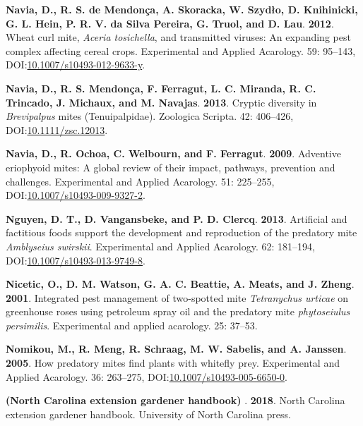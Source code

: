 \documentclass[12pt,final,CPage]{ufthesis}
\newlength{\cslhangindent}
\newenvironment{CSLReferences}[2] %
{%
	\setlength{\parindent}{0pt}
	\ifodd #1 \everypar{\setlength{\hangindent}{\cslhangindent}}\ignorespaces\fi
	\ifnum #2 > 0
	\setlength{\parskip}{#2\baselineskip}
	\fi
}%
{}
\begin{document}
{\begin{CSLReferences}{1}{0}
  \leavevmode{}%
  \textbf{Navia, D., R. S. de Mendonça, A. Skoracka, W. Szydło, D. Knihinicki, G. L. Hein, P. R. V. da Silva Pereira, G. Truol, and D. Lau}. \textbf{2012}. {Wheat curl mite}, {\emph{Aceria tosichella}}, and transmitted viruses: An expanding pest complex affecting cereal crops. Experimental and Applied Acarology. 59: 95--143, DOI:\href{https://doi.org/10.1007/s10493-012-9633-y}{10.1007/s10493-012-9633-y}.

  \leavevmode{}%
  \textbf{Navia, D., R. S. Mendonça, F. Ferragut, L. C. Miranda, R. C. Trincado, J. Michaux, and M. Navajas}. \textbf{2013}. Cryptic diversity in {\emph{Brevipalpus}} mites ({Tenuipalpidae}). Zoologica Scripta. 42: 406--426, DOI:\href{https://doi.org/10.1111/zsc.12013}{10.1111/zsc.12013}.

  \leavevmode{}%
  \textbf{Navia, D., R. Ochoa, C. Welbourn, and F. Ferragut}. \textbf{2009}. Adventive eriophyoid mites: A global review of their impact, pathways, prevention and challenges. Experimental and Applied Acarology. 51: 225--255, DOI:\href{https://doi.org/10.1007/s10493-009-9327-2}{10.1007/s10493-009-9327-2}.

  \leavevmode{}%
  \textbf{Nguyen, D. T., D. Vangansbeke, and P. D. Clercq}. \textbf{2013}. Artificial and factitious foods support the development and reproduction of the predatory mite {\emph{Amblyseius swirskii}}. Experimental and Applied Acarology. 62: 181--194, DOI:\href{https://doi.org/10.1007/s10493-013-9749-8}{10.1007/s10493-013-9749-8}.

  \leavevmode{}%
  \textbf{Nicetic, O., D. M. Watson, G. A. C. Beattie, A. Meats, and J. Zheng}. \textbf{2001}. Integrated pest management of two-spotted mite {\emph{Tetranychus urticae}} on greenhouse roses using petroleum spray oil and the predatory mite \emph{phytoseiulus persimilis}. Experimental and applied acarology. 25: 37--53.

  \leavevmode{}%
  \textbf{Nomikou, M., R. Meng, R. Schraag, M. W. Sabelis, and A. Janssen}. \textbf{2005}. How predatory mites find plants with whitefly prey. Experimental and Applied Acarology. 36: 263--275, DOI:\href{https://doi.org/10.1007/s10493-005-6650-0}{10.1007/s10493-005-6650-0}.

  \leavevmode{}%
  \textbf{({North Carolina} extension gardener handbook) }. \textbf{2018}. {North Carolina} extension gardener handbook. University of {North Carolina} press.


\end{CSLReferences}}
\end{document}
